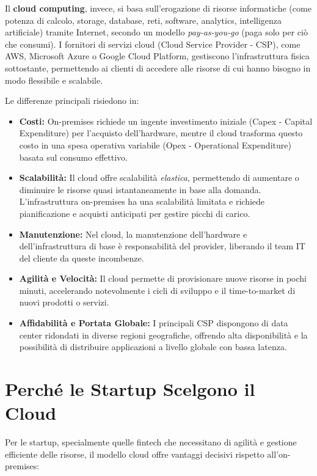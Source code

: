 \documentclass[a4paper,12pt]{report}
\begin{document}
Il \textbf{cloud computing}, invece, si basa sull'erogazione di risorse informatiche (come potenza di calcolo, storage, database, reti, software, analytics, intelligenza artificiale) tramite Internet, secondo un modello \textit{pay-as-you-go} (paga solo per ciò che consumi). I fornitori di servizi cloud (Cloud Service Provider - CSP), come AWS, Microsoft Azure o Google Cloud Platform, gestiscono l'infrastruttura fisica sottostante, permettendo ai clienti di accedere alle risorse di cui hanno bisogno in modo flessibile e scalabile.

Le differenze principali risiedono in:
\begin{itemize}
    \item \textbf{Costi:} On-premises richiede un ingente investimento iniziale (Capex - Capital Expenditure) per l'acquisto dell'hardware, mentre il cloud trasforma questo costo in una spesa operativa variabile (Opex - Operational Expenditure) basata sul consumo effettivo.
    \item \textbf{Scalabilità:} Il cloud offre scalabilità \textit{elastica}, permettendo di aumentare o diminuire le risorse quasi istantaneamente in base alla domanda. L'infrastruttura on-premises ha una scalabilità limitata e richiede pianificazione e acquisti anticipati per gestire picchi di carico.
    \item \textbf{Manutenzione:} Nel cloud, la manutenzione dell'hardware e dell'infrastruttura di base è responsabilità del provider, liberando il team IT del cliente da queste incombenze.
    \item \textbf{Agilità e Velocità:} Il cloud permette di provisionare nuove risorse in pochi minuti, accelerando notevolmente i cicli di sviluppo e il time-to-market di nuovi prodotti o servizi.
    \item \textbf{Affidabilità e Portata Globale:} I principali CSP dispongono di data center ridondati in diverse regioni geografiche, offrendo alta disponibilità e la possibilità di distribuire applicazioni a livello globale con bassa latenza.
\end{itemize}

\section{Perché le Startup Scelgono il Cloud}
\label{sec:startup-cloud-choice}

Per le startup, specialmente quelle fintech che necessitano di agilità e gestione efficiente delle risorse, il modello cloud offre vantaggi decisivi rispetto all'on-premises:
\end{document}
